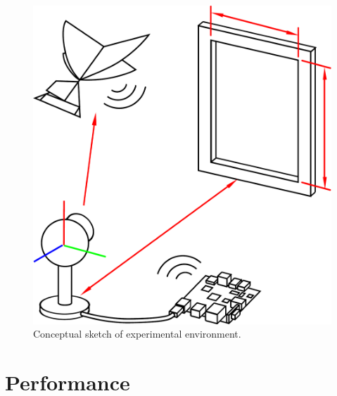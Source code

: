 \documentclass{aamas2013}
\begin{document}
\begin{figure}[tb]
\centering
\includegraphics[width=\linewidth]{figures/experiment_cartoon.pdf}
\caption{Conceptual sketch of experimental environment.}
\label{fig:experiment_cartoon}
\end{figure}


\section{Performance}

\end{document}
